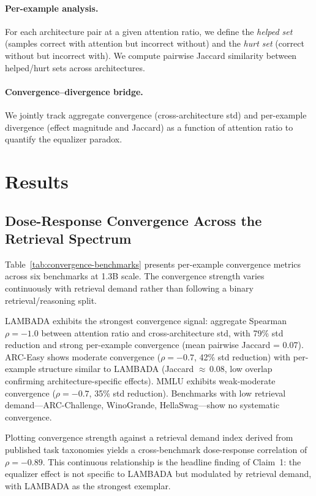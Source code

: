 \documentclass[11pt,a4paper]{article}
\begin{document}
\paragraph{Per-example analysis.}
For each architecture pair at a given attention ratio, we define the \emph{helped set} (samples correct with attention but incorrect without) and the \emph{hurt set} (correct without but incorrect with).
We compute pairwise Jaccard similarity between helped/hurt sets across architectures.

\paragraph{Convergence--divergence bridge.}
We jointly track aggregate convergence (cross-architecture std) and per-example divergence (effect magnitude and Jaccard) as a function of attention ratio to quantify the equalizer paradox.


\section{Results}

\subsection{Dose-Response Convergence Across the Retrieval Spectrum}
\label{sec:dose-response}

Table~\ref{tab:convergence-benchmarks} presents per-example convergence metrics across six benchmarks at 1.3B scale.
The convergence strength varies continuously with retrieval demand rather than following a binary retrieval/reasoning split.

LAMBADA exhibits the strongest convergence signal: aggregate Spearman $\rho{=}{-}1.0$ between attention ratio and cross-architecture std, with 79\% std reduction and strong per-example convergence (mean pairwise Jaccard = 0.07).
ARC-Easy shows moderate convergence ($\rho{=}{-}0.7$, 42\% std reduction) with per-example structure similar to LAMBADA (Jaccard $\approx$\,0.08, low overlap confirming architecture-specific effects).
MMLU exhibits weak-moderate convergence ($\rho{=}{-}0.7$, 35\% std reduction).
Benchmarks with low retrieval demand---ARC-Challenge, WinoGrande, HellaSwag---show no systematic convergence.

Plotting convergence strength against a retrieval demand index derived from published task taxonomies yields a cross-benchmark dose-response correlation of $\rho{=}{-}0.89$.
This continuous relationship is the headline finding of Claim~1: the equalizer effect is not specific to LAMBADA but modulated by retrieval demand, with LAMBADA as the strongest exemplar.
\end{document}
